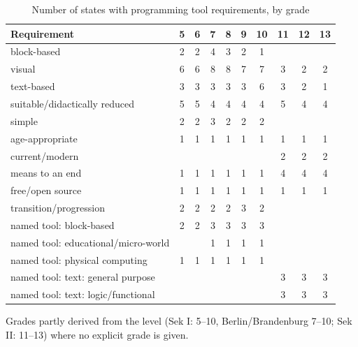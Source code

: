 \begin{table}
\centering
\small
\begin{threeparttable}
\caption{Number of states with programming tool requirements, by grade}\label{tab:curricula-grades}
\begin{tabular}{lccccccccc}
\toprule
Requirement & 5 & 6 & 7 & 8 & 9 & 10 & 11 & 12 & 13 \\
\midrule
block-based & 2 & 2 & 4 & 3 & 2 & 1 &  &  &  \\
visual & 6 & 6 & 8 & 8 & 7 & 7 & 3 & 2 & 2 \\
text-based & 3 & 3 & 3 & 3 & 3 & 6 & 3 & 2 & 1 \\
suitable/didactically reduced & 5 & 5 & 4 & 4 & 4 & 4 & 5 & 4 & 4 \\
simple & 2 & 2 & 3 & 2 & 2 & 2 &  &  &  \\
age-appropriate & 1 & 1 & 1 & 1 & 1 & 1 & 1 & 1 & 1 \\
current/modern &  &  &  &  &  &  & 2 & 2 & 2 \\
means to an end & 1 & 1 & 1 & 1 & 1 & 1 & 4 & 4 & 4 \\
free/open source & 1 & 1 & 1 & 1 & 1 & 1 & 1 & 1 & 1 \\
transition/progression & 2 & 2 & 2 & 2 & 3 & 2 &  &  &  \\
named tool: block-based & 2 & 2 & 3 & 3 & 3 & 3 &  &  &  \\
named tool: educational/micro-world &  &  & 1 & 1 & 1 & 1 &  &  &  \\
named tool: physical computing & 1 & 1 & 1 & 1 & 1 & 1 &  &  &  \\
named tool: text: general purpose &  &  &  &  &  &  & 3 & 3 & 3 \\
named tool: text: logic/functional &  &  &  &  &  &  & 3 & 3 & 3 \\
\bottomrule
\end{tabular}

\begin{tablenotes}\smaller
\item Grades partly derived from the level (Sek I: 5--10, Berlin/Brandenburg 7--10; Sek II: 11--13) where no explicit grade is given.
\end{tablenotes}
\end{threeparttable}
\end{table}
